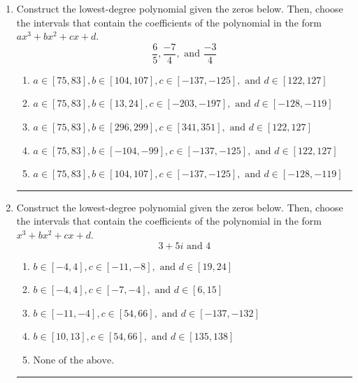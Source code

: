 \documentclass[14pt]{extbook}
\newcommand{\litem}[1]{\item#1\hspace*{-1cm}\rule{\textwidth}{0.4pt}}
\begin{document}
\begin{enumerate}
{\begin{enumerate}[label=\Alph*.]
\end{enumerate} }
\litem{
Construct the lowest-degree polynomial given the zeros below. Then, choose the intervals that contain the coefficients of the polynomial in the form $ax^3+bx^2+cx+d$.\[ \frac{6}{5}, \frac{-7}{4}, \text{ and } \frac{-3}{4} \]\begin{enumerate}[label=\Alph*.]
\item \( a \in [75, 83], b \in [104, 107], c \in [-137, -125], \text{ and } d \in [122, 127] \)
\item \( a \in [75, 83], b \in [13, 24], c \in [-203, -197], \text{ and } d \in [-128, -119] \)
\item \( a \in [75, 83], b \in [296, 299], c \in [341, 351], \text{ and } d \in [122, 127] \)
\item \( a \in [75, 83], b \in [-104, -99], c \in [-137, -125], \text{ and } d \in [122, 127] \)
\item \( a \in [75, 83], b \in [104, 107], c \in [-137, -125], \text{ and } d \in [-128, -119] \)

\end{enumerate} }
\litem{
Construct the lowest-degree polynomial given the zeros below. Then, choose the intervals that contain the coefficients of the polynomial in the form $x^3+bx^2+cx+d$.\[ 3 + 5 i \text{ and } 4 \]\begin{enumerate}[label=\Alph*.]
\item \( b \in [-4, 4], c \in [-11, -8], \text{ and } d \in [19, 24] \)
\item \( b \in [-4, 4], c \in [-7, -4], \text{ and } d \in [6, 15] \)
\item \( b \in [-11, -4], c \in [54, 66], \text{ and } d \in [-137, -132] \)
\item \( b \in [10, 13], c \in [54, 66], \text{ and } d \in [135, 138] \)
\item \( \text{None of the above.} \)


\end{enumerate}}
\end{enumerate}
\end{document}

